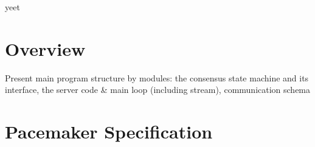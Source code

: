 yeet \cite{yin2019hotstuff}







\section{Overview}
Present main program structure by modules: the consensus state machine and its interface, the server code & main loop (including stream), communication schema
\section{Pacemaker Specification}
